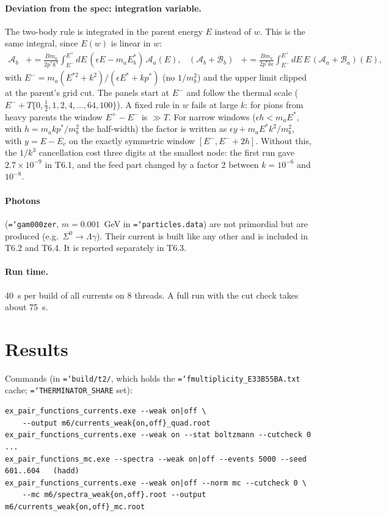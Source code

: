 \documentclass[11pt,a4paper]{article}
\newcommand{\code}[1]{\texttt{\hyphenchar\font=`\-#1}}
\begin{document}
\paragraph{Deviation from the spec: integration variable.} The two-body rule is integrated in the
parent energy $E$ instead of $w$. This is the same integral, since $E(w)$ is linear in $w$:
\begin{align*}
\mathcal A_b&\mathrel{+}=\frac{Bm_a}{2p^*k^3}\int_{E^-}^{E^+}\!dE\,(\epsilon E-m_aE_b^*)\,\mathcal A_a(E),&
(\mathcal A_b+\mathcal B_b)&\mathrel{+}=\frac{Bm_a}{2p^*k\epsilon}\int_{E^-}^{E^+}\!dE\,E\,(\mathcal A_a+\mathcal B_a)(E),
\end{align*}
with $E^-=m_a(E^{*2}+k^2)/(\epsilon E^*+kp^*)$ (no $1/m_b^2$) and the upper limit clipped at the
parent's grid cut. The panels start at $E^-$ and follow the thermal scale
($E^-+T\{0,\tfrac12,1,2,4,\dots,64,100\}$). A fixed rule in $w$ fails at large $k$: for pions from
heavy parents the window $E^+-E^-$ is $\gg T$. For narrow windows ($\epsilon h<m_aE^*$, with
$h=m_akp^*/m_b^2$ the half-width) the factor is written as $\epsilon y+m_aE^*k^2/m_b^2$, with
$y=E-E_c$ on the exactly symmetric window $[E^-,E^-+2h]$. Without this, the $1/k^3$ cancellation
cost three digits at the smallest node: the first run gave $2.7\times10^{-9}$ in T6.1, and the
feed part changed by a factor 2 between $k=10^{-6}$ and $10^{-8}$.

\paragraph{Photons} (\code{gam000zer}, $m=0.001$~GeV in \code{particles.data}) are not primordial
but are produced (e.g.\ $\Sigma^0\to\Lambda\gamma$). Their current is built like any other and is
included in T6.2 and T6.4. It is reported separately in T6.3.

\paragraph{Run time.} 40~s per build of all currents on 8 threads. A full run with the cut check
takes about 75~s.

\section{Results}
Commands (in \code{build/t2/}, which holds the \code{fmultiplicity\_E33B55BA.txt} cache;
\code{THERMINATOR\_SHARE} set):
\begin{verbatim}
ex_pair_functions_currents.exe --weak on|off \
    --output m6/currents_weak{on,off}_quad.root
ex_pair_functions_currents.exe --weak on --stat boltzmann --cutcheck 0 ...
ex_pair_functions_mc.exe --spectra --weak on|off --events 5000 --seed 601..604   (hadd)
ex_pair_functions_currents.exe --weak on|off --norm mc --cutcheck 0 \
    --mc m6/spectra_weak{on,off}.root --output m6/currents_weak{on,off}_mc.root
\end{verbatim}
\end{document}
